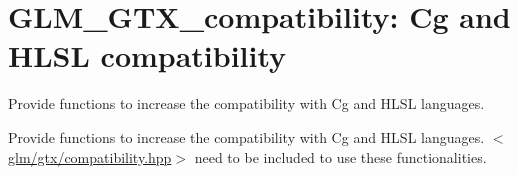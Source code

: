 \hypertarget{group__gtx__compatibility}{\section{\-G\-L\-M\-\_\-\-G\-T\-X\-\_\-compatibility\-: \-Cg and \-H\-L\-S\-L compatibility}
\label{group__gtx__compatibility}
}


\-Provide functions to increase the compatibility with \-Cg and \-H\-L\-S\-L languages.  


\-Provide functions to increase the compatibility with \-Cg and \-H\-L\-S\-L languages. $<$\hyperlink{compatibility_8hpp}{glm/gtx/compatibility.\-hpp}$>$ need to be included to use these functionalities. 